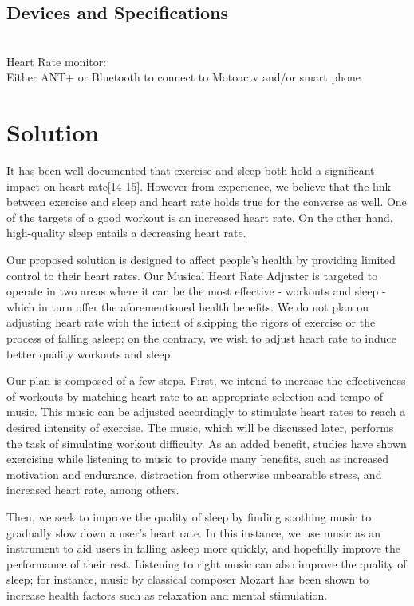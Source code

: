 \documentclass[letterpaper,english, 12pt]{scrreprt}
\begin{document}
\subsection{Devices and Specifications}

\\
Heart Rate monitor:\\
Either ANT+ or Bluetooth to connect to Motoactv and/or smart phone\\


\section{Solution}
It has been well documented that exercise and sleep both hold a significant impact on heart rate[14-15]. However from experience, we believe that the link between exercise and sleep and heart rate holds true for the converse as well. One of the targets of a good workout is an increased heart rate. On the other hand, high-quality sleep entails a decreasing heart rate.
			 
Our proposed solution is designed to affect people's health by providing limited control to their heart rates. Our Musical Heart Rate Adjuster is targeted to operate in two areas where it can be the most effective - workouts and sleep - which in turn offer the aforementioned health benefits. We do not plan on adjusting heart rate with the intent of skipping the rigors of exercise or the process of falling asleep; on the contrary, we wish to adjust heart rate to induce better quality workouts and sleep.
			 
Our plan is composed of a few steps. First, we intend to increase the effectiveness of workouts by matching heart rate to an appropriate selection and tempo of music. This music can be adjusted accordingly to stimulate heart rates to reach a desired intensity of exercise. The music, which will be discussed later, performs the task of simulating workout difficulty. As an added benefit, studies have shown exercising while listening to music to provide many benefits, such as increased motivation and endurance, distraction from otherwise unbearable stress, and increased heart rate, among others.
			 
Then, we seek to improve the quality of sleep by finding soothing music to gradually slow down a user's heart rate. In this instance, we use music as an instrument to aid users in falling asleep more quickly, and hopefully improve the performance of their rest. Listening to right music can also improve the quality of sleep; for instance, music by classical composer Mozart has been shown to increase health factors such as relaxation and mental stimulation.
			 
\end{document}
